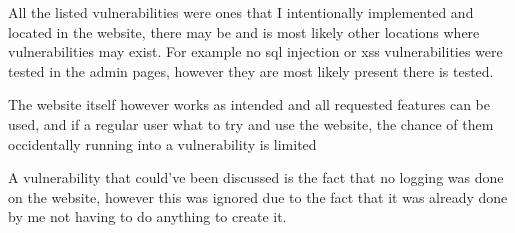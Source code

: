 \documentclass[titlepage]{article}
\begin{document}
All the listed vulnerabilities were ones that I intentionally implemented and located in the website, there may be and is most likely other locations where vulnerabilities may exist. For example no sql injection or xss vulnerabilities were tested in the admin pages, however they are most likely present there is tested.

The website itself however works as intended and all requested features can be used, and if a regular user what to try and use the website, the chance of them occidentally running into a vulnerability is limited


A vulnerability that could've been discussed is the fact that no logging was done on the website, however this was ignored due to the fact that it was already done by me not having to do anything to create it. 
\nocite{*}
\printbibliography[
   heading=bibintoc,
   title={References}
]
\end{document}
